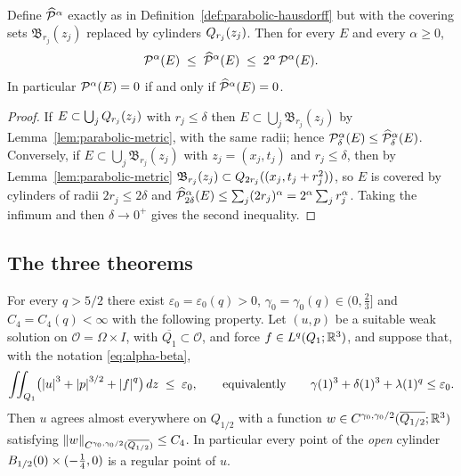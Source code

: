 \documentclass[11pt,reqno]{amsart}
\begin{document}
\begin{lemma}\label{lem:P1-cylinders}
Define $\widehat{\mathcal{P}}^{\alpha}$ exactly as in
Definition~\ref{def:parabolic-hausdorff} but with the covering sets
$\mathfrak{B}_{r_{j}}(z_{j})$ replaced by cylinders $Q_{r_{j}}(z_{j})$. Then
for every $E$ and every $\alpha\ge0$,
\[
  \mathcal{P}^{\alpha}(E)\;\le\;\widehat{\mathcal{P}}^{\alpha}(E)
  \;\le\;2^{\alpha}\,\mathcal{P}^{\alpha}(E) .
\]
In particular $\mathcal{P}^{\alpha}(E)=0$ if and only if
$\widehat{\mathcal{P}}^{\alpha}(E)=0$.
\end{lemma}

\begin{proof}
If $E\subset\bigcup_{j}Q_{r_{j}}(z_{j})$ with $r_{j}\le\delta$ then
$E\subset\bigcup_{j}\mathfrak{B}_{r_{j}}(z_{j})$ by
Lemma~\ref{lem:parabolic-metric}, with the same radii; hence
$\mathcal{P}^{\alpha}_{\delta}(E)\le\widehat{\mathcal{P}}^{\alpha}_{\delta}(E)$.
Conversely, if $E\subset\bigcup_{j}\mathfrak{B}_{r_{j}}(z_{j})$ with
$z_{j}=(x_{j},t_{j})$ and $r_{j}\le\delta$, then by
Lemma~\ref{lem:parabolic-metric}
$\mathfrak{B}_{r_{j}}(z_{j})\subset Q_{2r_{j}}((x_{j},t_{j}+r_{j}^{2}))$, so
$E$ is covered by cylinders of radii $2r_{j}\le2\delta$ and
$\widehat{\mathcal{P}}^{\alpha}_{2\delta}(E)\le\sum_{j}(2r_{j})^{\alpha}
 =2^{\alpha}\sum_{j}r_{j}^{\alpha}$. Taking the infimum and then
$\delta\to0^{+}$ gives the second inequality.
\end{proof}

\subsection{The three theorems}\label{ss:main-theorems}

\begin{theorem}\label{thm:A}
For every $q>5/2$ there exist $\varepsilon_{0}=\varepsilon_{0}(q)>0$,
$\gamma_{0}=\gamma_{0}(q)\in(0,\tfrac23]$ and $C_{4}=C_{4}(q)<\infty$ with the
following property. Let $(u,p)$ be a suitable weak solution on
$\mathcal{O}=\Omega\times I$, with $\overline{Q_{1}}\subset\mathcal{O}$, and force $f\in L^{q}(Q_{1};\mathbb{R}^{3})$, and
suppose that, with the notation \eqref{eq:alpha-beta},
\begin{equation}\label{eq:thmA-hyp}
  \iint_{Q_{1}}\bigl(\left\lvert u \right\rvert^{3}+\left\lvert p \right\rvert^{3/2}+\left\lvert f \right\rvert^{q}\bigr)\,dz
  \;\le\;\varepsilon_{0},
  \qquad\text{equivalently}\qquad
  \gamma(1)^{3}+\delta(1)^{3}+\lambda(1)^{q}\le\varepsilon_{0}.
\end{equation}
Then $u$ agrees almost everywhere on $Q_{1/2}$ with a function
$w\in C^{\gamma_{0},\gamma_{0}/2}(\overline{Q_{1/2}};\mathbb{R}^{3})$ satisfying
$\left\lVert w \right\rVert_{C^{\gamma_{0},\gamma_{0}/2}(\overline{Q_{1/2}})}\le C_{4}$. In
particular every point of the \emph{open} cylinder
$B_{1/2}(0)\times(-\tfrac14,0)$ is a regular point of $u$.
\end{theorem}
\end{document}
